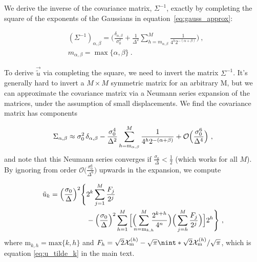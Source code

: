 \documentclass[prx,reprint,superscriptaddress,longbibliography,floatfix,nofootinbib]{revtex4-1}
\DeclarePairedDelimiter{\nint}\lfloor\rceil
\begin{document}
We derive the inverse of the covariance matrix, $\Sigma^{-1}$, exactly by completing the square of the exponents of the Gaussians in equation~\eqref{eq:gauss_approx}:

\begin{equation}
\begin{split}
   & (\Sigma^{-1})_{\alpha,\beta} = \Big(\frac{\delta_{\alpha,\beta}}{\sigma_0^2} + \frac{1}{\Delta^2}{\displaystyle\sum_{h=m_{\alpha,\beta}}^{M}\frac{1}{4^{h}2^{-(\alpha+\beta)}}}\Big) \ , \\
   & m_{\alpha,\beta} = \max{\{\alpha,\beta\}} \ .
   \end{split}
\end{equation}

To derive $\vec{\tilde{u}}$ via completing the square, we need to invert the matrix $\Sigma^{-1}$. It's generally hard to invert a $M\times M$ symmetric matrix for an arbitrary M, but we can approximate the covariance matrix via a Neumann series expansion of the matrices, under the assumption of small displacements. We find the covariance matrix has components

\begin{equation}
    \Sigma_{\alpha,\beta} \approx \sigma_0^2 \hspace{0.05cm} \delta_{\alpha,\beta} -  \frac{\sigma_0^4}{\Delta^2}  \sum_{h=\text{m}_{\alpha,\beta}}^{M}\frac{1}{4^{h}2^{-(\alpha+\beta)}} + \mathcal{O}\Big(\frac{\sigma_0^6}{\Delta^4}\Big) \ , 
\end{equation}
\noindent and note that this Neumann series converges if $\frac{\sigma_0}{\Delta} < \frac{1}{2}$ (which works for all $M$). By ignoring from order $\mathcal{O}\Big(\frac{\sigma_0^6}{\Delta^6}\Big)$ upwards in the expansion, we compute

\begin{equation}
\begin{split}
    \tilde{u}_{k} = \Big(\frac{\sigma_0}{\Delta}\Big)^2 \Bigg\{&2^{k} \sum_{j=1}^{M}\frac{F_j}{2^j} \\
    & - \Big(\frac{\sigma_0}{\Delta}\Big)^2\sum_{h=1}^{M}\Big[\Big(\hspace{-0.2cm}\sum_{n=\text{m}_{k,h}}^{M}\hspace{-0.2cm}\frac{2^{k+h}}{4^n}\Big)\Big(\sum_{j=h}^{M}\frac{F_j}{2^j}\Big)\Big]2^{h}\Bigg\} \ ,
\end{split}
\end{equation}
\noindent where $\text{m}_{k,h} = \text{max}\{k,h\}$ and $F_h = \sqrt{2}\mathcal{X}_\text{m}^{(h)}-\sqrt{\pi}\nint*{\sqrt{2}\mathcal{X}_\text{m}^{(h)}/\sqrt{\pi}}$, which is equation \eqref{eq:u_tilde_k} in the main text.
\end{document}
